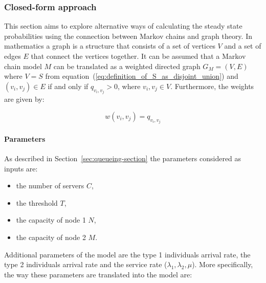 \subsubsection{Closed-form approach}

This section aims to explore alternative ways of calculating the steady state
probabilities using the connection between Markov chains and graph
theory.
In mathematics a graph is a structure that consists of a set of vertices \(V\)
and a set of edges \(E\) that connect the vertices together.
It can be assumed that a Markov chain model \(M\) can be translated as a
weighted directed graph \(G_M = (V, E)\) where \(V=S\) from
equation~(\ref{eq:definition_of_S_as_disjoint_union}) and \((v_i, v_j)\in E\) if
and only if \(q_{v_i, v_j}>0\), where \(v_i, v_j \in V\).
Furthermore, the weights are given by:

\[
    w(v_i, v_j) = q_{v_i, v_j}
\]

\paragraph{Parameters}
As described in Section~\ref{sec:queueing-section} the parameters considered as
inputs are:

\begin{itemize}
    \item the number of servers \(C\),
    \item the threshold \(T\),
    \item the capacity of node 1 \(N\),
    \item the capacity of node 2 \(M\).
\end{itemize}

Additional parameters of the model are the type 1 individuals arrival rate,
the type 2 individuals arrival rate and the service rate (\(\lambda_1,
\lambda_2, \mu\)).
More specifically, the way these parameters are translated into the model are:

